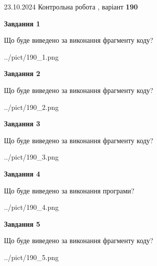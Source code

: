 \documentclass[12pt, ukrainian]{article}
\begin{document}
{\Large{23.10.2024 Контрольна робота , варіант  \No \textbf { 190 }\par}}
{
\begin {large}
{\begin {center}\textbf{Завдання 1}\end {center}}

Що буде виведено за виконання фрагменту коду?\par
\begin{center}
	{../pict/190_1.png}
\end{center}
\newpage

{\begin {center}\textbf{Завдання 2}\end {center}}

Що буде виведено за виконання фрагменту коду?\par
\begin{center}
	{../pict/190_2.png}
\end{center}
\newpage

{\begin {center}\textbf{Завдання 3}\end {center}}

Що буде виведено за виконання фрагменту коду?\par
\begin{center}
	{../pict/190_3.png}
\end{center}
\newpage

{\begin {center}\textbf{Завдання 4}\end {center}}

Що буде виведено за виконання програми?\par
\begin{center}
	{../pict/190_4.png}
\end{center}
\newpage

{\begin {center}\textbf{Завдання 5}\end {center}}

Що буде виведено за виконання фрагменту коду?\par
\begin{center}
	{../pict/190_5.png}
\end{center}
\newpage


\end{large}}
\end{document}
